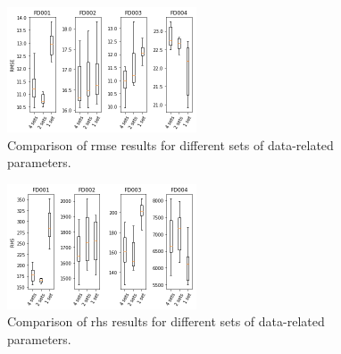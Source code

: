 \begin{figure}[!htb]
\centering
\includegraphics[width=0.5\textwidth]{img/rmse_comparisson.png}
\caption{Comparison of \gls{rmse} results for different sets of data-related parameters.}
\label{fig:scores_rmse}
\end{figure}

\begin{figure}[!htb]
\centering
\includegraphics[width=0.5\textwidth]{img/rhs_comparisson.png}
\caption{Comparison of \gls{rhs} results for different sets of data-related parameters.}
\label{fig:scores_rhs}
\end{figure}